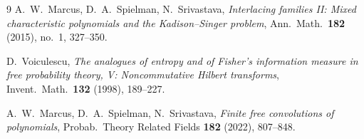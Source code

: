 \documentclass[12pt]{article}
\theoremstyle{definition}
\begin{document}
\begin{thebibliography}{9}
A.~W.~Marcus, D.~A.~Spielman, N.~Srivastava,
\emph{Interlacing families II: Mixed characteristic polynomials and the Kadison--Singer problem},
Ann.\ Math.\ \textbf{182} (2015), no.~1, 327--350.

D.~Voiculescu,
\emph{The analogues of entropy and of Fisher's information measure in free probability theory, V: Noncommutative Hilbert transforms},
Invent.\ Math.\ \textbf{132} (1998), 189--227.

A.~W.~Marcus, D.~A.~Spielman, N.~Srivastava,
\emph{Finite free convolutions of polynomials},
Probab.\ Theory Related Fields \textbf{182} (2022), 807--848.
\end{thebibliography}
\end{document}
